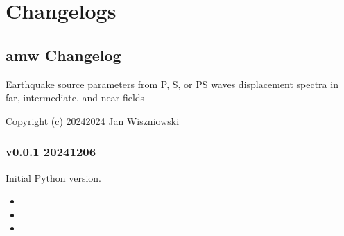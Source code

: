 \documentclass[letterpaper,10pt,english]{sphinxmanual}
\begin{document}
\sphinxstepscope


\chapter{Changelogs}
\label{\detokenize{changelog:changelogs}}\label{\detokenize{changelog:changelog}}\label{\detokenize{changelog::doc}}

\section{amw Changelog}
\label{\detokenize{changelog:amw-changelog}}
\sphinxAtStartPar
Earthquake source parameters from P, S, or PS waves displacement spectra
in far, intermediate, and near fields

\sphinxAtStartPar
Copyright (c) 2024\sphinxhyphen{}2024 Jan Wiszniowski 


\subsection{v0.0.1 \sphinxhyphen{} 2024\sphinxhyphen{}12\sphinxhyphen{}06}
\label{\detokenize{changelog:v0-0-1-2024-12-06}}
\sphinxAtStartPar
Initial Python version.

\sphinxstepscope

\cleardoublepage
\begingroup
\renewcommand\chapter[1]{\endgroup}


\chapter{References}
\label{\detokenize{bibliography:references}}\label{\detokenize{bibliography::doc}}

\chapter{Indices and tables}
\label{\detokenize{index:indices-and-tables}}\begin{itemize}
\item {} 
\sphinxAtStartPar
{}

\item {} 
\sphinxAtStartPar
{}

\item {} 
\sphinxAtStartPar
{}

\end{itemize}
\end{document}
